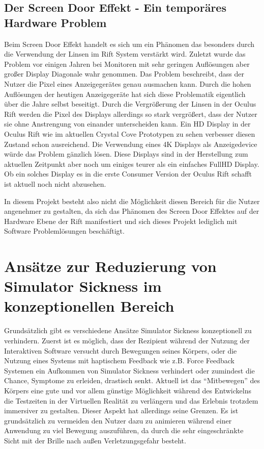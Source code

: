 \documentclass[pagesize, paper=a4, fontsize=12pt,titlepage=true, headings=small, headnosepline, abstractoff, liststotoc, nochapterprefix, plainheadsepline, twoside]{scrreprt}
\begin{document}
\subsection{Der Screen Door Effekt - Ein temporäres Hardware Problem}
Beim Screen Door Effekt handelt es sich um ein Phänomen das besonders durch die Verwendung der Linsen im Rift System verstärkt wird. Zuletzt wurde das Problem vor einigen Jahren bei Monitoren mit sehr geringen Auflösungen aber großer Display Diagonale wahr genommen. Das Problem beschreibt, dass der Nutzer die Pixel eines Anzeigegerätes genau ausmachen kann. Durch die hohen Auflösungen der heutigen Anzeigegeräte hat sich diese Problematik eigentlich über die Jahre selbst beseitigt. Durch die Vergrößerung der Linsen in der Oculus Rift werden die Pixel des Displays allerdings so stark vergrößert, dass der Nutzer sie ohne Anstrengung von einander unterscheiden kann. Ein HD Display in der Oculus Rift wie im aktuellen Crystal Cove Prototypen zu sehen verbesser diesen Zustand schon ausreichend. Die Verwendung eines 4K Displays als Anzeigedevice würde das Problem gänzlich lösen. Diese Displays sind in der Herstellung zum aktuellen Zeitpunkt aber noch um einiges teurer als ein einfaches FullHD Display. Ob ein solches Display es in die erste Consumer Version der Oculus Rift schafft ist aktuell noch nicht abzusehen. 

In diesem Projekt besteht also nicht die Möglichkeit diesen Bereich für die Nutzer angenehmer zu gestalten, da sich das Phänomen des Screen Door Effektes auf der Hardware Ebene der Rift manifestiert und sich dieses Projekt lediglich mit Software Problemlösungen beschäftigt.

\section{Ansätze zur Reduzierung von Simulator Sickness im konzeptionellen Bereich}
Grundsätzlich gibt es verschiedene Ansätze Simulator Sickness konzeptionell zu verhindern. Zuerst ist es möglich, dass der Rezipient während der Nutzung der Interaktiven Software versucht durch Bewegungen seines Körpers, oder die Nutzung eines Systems mit haptischem Feedback wie z.B. Force Feedback Systemen ein Aufkommen von Simulator Sickness verhindert oder zumindest die Chance, Symptome zu erleiden, drastisch senkt. Aktuell ist das "`Mitbewegen"' des Körpers eine gute und vor allem günstige Möglichkeit während des Entwickelns die Testzeiten in der Virtuellen Realität zu verlängern und das Erlebnis trotzdem immersiver zu gestalten. Dieser Aspekt hat allerdings seine Grenzen. Es ist grundsätzlich zu vermeiden den Nutzer dazu zu animieren während einer Anwendung zu viel Bewegung auszuführen, da durch die sehr eingeschränkte Sicht mit der Brille nach außen Verletzungsgefahr besteht.
\end{document}
